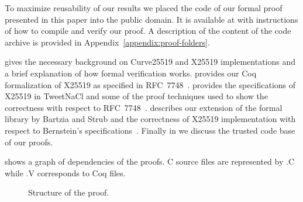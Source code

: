 

To maximize reusability of our results we placed the code of our formal proof
presented in this paper into the public domain.
It is available at 
with instructions of how to compile and verify our proof.
A description of the content of the code archive is provided in
Appendix~\ref{appendix:proof-folders}.

 gives the necessary background on Curve25519 and X25519
implementations and a brief explanation of how formal verification works.
 provides our Coq formalization of X25519 as specified in RFC~7748~\cite{rfc7748}.
 provides the specifications of X25519 in TweetNaCl and some of the
proof techniques used to show the correctness with respect to RFC~7748~\cite{rfc7748}.
 describes our extension of the formal library by Bartzia
and Strub and the correctness of X25519 implementation with respect to Bernstein's
specifications~\cite{Ber14}.
Finally in  we discuss the trusted code base of our proofs.

 shows a graph of dependencies of the proofs.
C source files are represented by {\color{doc@lstfunctions}.C} while
{\color{doc@lstfunctions}.V} corresponds to Coq files.

\begin{figure}[h]
  \centering
  
  \caption{Structure of the proof.}
  \label{tikz:ProofOverview}
\end{figure}


